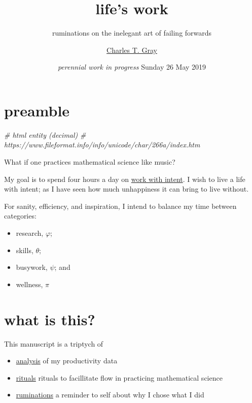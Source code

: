 \documentclass[]{book}
\title{life's work}
\subtitle{ruminations on the inelegant art of failing forwards}
\author{\href{http://cantabile.rbind.io/about.html}{Charles T. Gray}}
\date{\emph{perennial work in progress} Sunday 26 May 2019}
\newenvironment{Shaded}{\begin{snugshade}}{\end{snugshade}}
\newcommand{\CommentTok}[1]{\textcolor[rgb]{0.56,0.35,0.01}{\textit{#1}}}
\providecommand{\tightlist}{%
  \setlength{\itemsep}{0pt}\setlength{\parskip}{0pt}}
\begin{document}
\maketitle

{
\setcounter{tocdepth}{1}
\tableofcontents
}
\hypertarget{preamble}{%
\chapter{preamble}\label{preamble}}

\begin{Shaded}
\begin{Highlighting}[]
\CommentTok{# html entity (decimal) }
\CommentTok{# https://www.fileformat.info/info/unicode/char/266a/index.htm}
\end{Highlighting}
\end{Shaded}

What if one practices mathematical science like music?

My goal is to spend four hours a day on \protect\hyperlink{work-with-intent}{work with intent}. I wish to live a life with intent; as I have seen how much unhappiness it can bring to live without.

For sanity, efficiency, and inspiration, I intend to balance my time between categories:

\begin{itemize}
\tightlist
\item
  research, \(\varphi\);
\item
  skills, \(\theta\);\\
\item
  busywork, \(\psi\); and
\item
  wellness, \(\pi\)
\end{itemize}

\hypertarget{what-is-this}{%
\chapter{what is this?}\label{what-is-this}}

This manuscript is a triptych of

\begin{itemize}
\tightlist
\item
  \protect\hyperlink{analysis}{analysis} of my productivity data
\item
  \protect\hyperlink{rituals}{rituals} rituals to facillitate flow in practicing mathematical science
\item
  \protect\hyperlink{ruminations}{ruminations} a reminder to self about why I chose what I did
\end{itemize}
\end{document}
